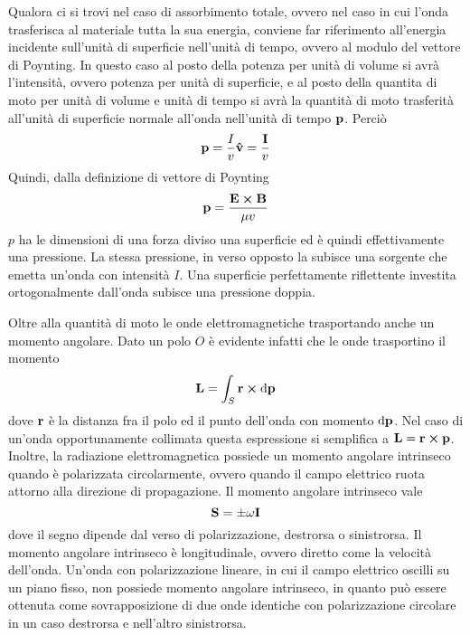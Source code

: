 Qualora ci si trovi nel caso di assorbimento totale, ovvero nel caso in cui l'onda trasferisca al materiale tutta la sua energia,
conviene far riferimento all'energia incidente sull'unità di superficie nell'unità di tempo, ovvero al modulo del vettore
di Poynting.
In questo caso al posto della potenza per unità di volume  si avrà l'intensità, ovvero potenza per unità di superficie,
e al posto della quantita di moto per unità di volume e unità di tempo
si avrà la quantità di moto trasferità all'unità di superficie normale all'onda nell'unità di tempo $\vb{p}$. Perciò
\[
    \vb{p}=\frac{I}{v}\vu{v}=\frac{\vb{I}}{v}
\]
Quindi, dalla definizione di vettore di Poynting
\begin{equation}
    \vb{p}=\frac{\vb{E}\cp\vb{B}}{\mu v}
\end{equation}
$p$ ha le dimensioni di una forza diviso una superficie ed è quindi effettivamente una pressione. La stessa pressione, in verso
opposto la subisce una sorgente che emetta un'onda con intensità $I$. Una superficie perfettamente riflettente investita
ortogonalmente dall'onda subisce una pressione doppia.

Oltre alla quantità di moto le onde elettromagnetiche trasportando anche un momento angolare. Dato un polo $O$ è evidente
infatti che le onde trasportino il momento
\[
    \vb{L}=\int_S\vb{r}\cp\dd{\vb{p}}
\]
dove $\vb{r}$ è la distanza fra il polo ed il punto dell'onda con momento $\dd{\vb{p}}$.
Nel caso di un'onda opportunamente collimata questa espressione si semplifica a $\vb{L}=\vb{r}\cp\vb{p}$.
Inoltre, la radiazione elettromagnetica possiede un momento angolare intrinseco quando è
polarizzata circolarmente, ovvero quando il campo elettrico ruota attorno alla direzione di
propagazione. Il momento angolare intrinseco vale
\[
    \vb{S}=\pm\omega\vb{I}
\]
dove il segno dipende dal verso di polarizzazione, destrorsa o sinistrorsa. Il momento angolare intrinseco è
longitudinale, ovvero diretto come la velocità dell'onda.
Un'onda con polarizzazione lineare, in cui il campo elettrico oscilli su un piano fisso, non possiede momento
angolare intrinseco, in quanto può essere ottenuta come sovrapposizione di due onde identiche con polarizzazione
circolare in un caso destrorsa e nell'altro sinistrorsa.

